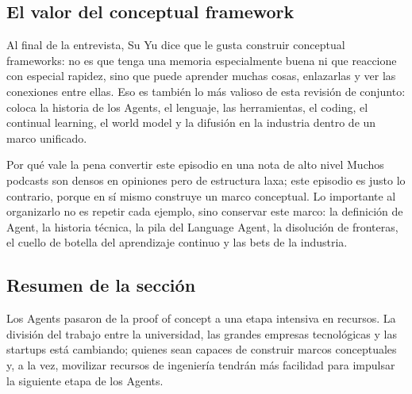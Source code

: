 \subsection{El valor del conceptual framework}

Al final de la entrevista, Su Yu dice que le gusta construir conceptual frameworks: no es que tenga una memoria especialmente buena ni que reaccione con especial rapidez, sino que puede aprender muchas cosas, enlazarlas y ver las conexiones entre ellas. Eso es también lo más valioso de esta revisión de conjunto: coloca la historia de los Agents, el lenguaje, las herramientas, el coding, el continual learning, el world model y la difusión en la industria dentro de un marco unificado.

\begin{importantbox}{Por qué vale la pena convertir este episodio en una nota de alto nivel}
Muchos podcasts son densos en opiniones pero de estructura laxa; este episodio es justo lo contrario, porque en sí mismo construye un marco conceptual. Lo importante al organizarlo no es repetir cada ejemplo, sino conservar este marco: la definición de Agent, la historia técnica, la pila del Language Agent, la disolución de fronteras, el cuello de botella del aprendizaje continuo y las bets de la industria.
\end{importantbox}

\subsection{Resumen de la sección}

Los Agents pasaron de la proof of concept a una etapa intensiva en recursos. La división del trabajo entre la universidad, las grandes empresas tecnológicas y las startups está cambiando; quienes sean capaces de construir marcos conceptuales y, a la vez, movilizar recursos de ingeniería tendrán más facilidad para impulsar la siguiente etapa de los Agents.
